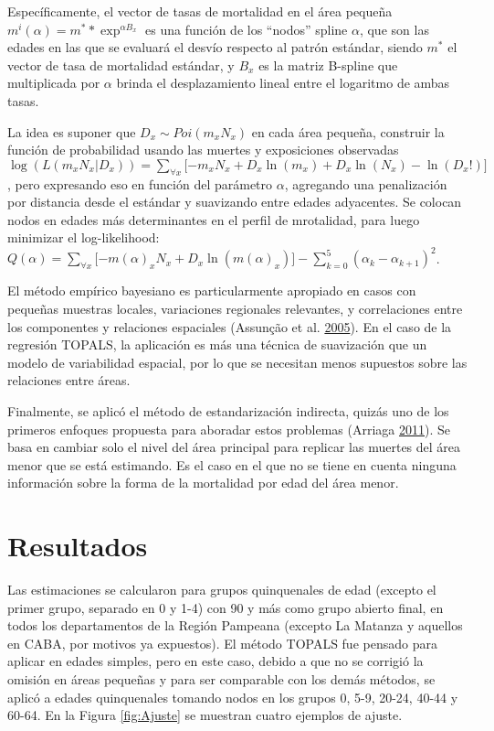 \documentclass[12pt,]{article}
\begin{document}
Específicamente, el vector de tasas de mortalidad en el área pequeña
\(m^{i}(\alpha) = m^{*}*\exp^{\alpha B_{x}}\) es una función de los
``nodos'' spline \(\alpha\), que son las edades en las que se evaluará
el desvío respecto al patrón estándar, siendo \(m^*\) el vector de tasa
de mortalidad estándar, y \(B_{x}\) es la matriz B-spline que
multiplicada por \(\alpha\) brinda el desplazamiento lineal entre el
logaritmo de ambas tasas.

La idea es suponer que \(D_{x}\sim Poi (m_ {x} N_ {x})\) en cada área
pequeña, construir la función de probabilidad usando las muertes y
exposiciones observadas
\(\log(L(m_{x}N_{x}|D_{x}))=\sum_{\forall x}{\lbrack -m_{x}N_{x}+D_{x}\ln (m_{x})+D_{x}\ln (N_{x})-\ln (D_{x}!)\rbrack}\),
pero expresando eso en función del parámetro \(\alpha\), agregando una
penalización por distancia desde el estándar y suavizando entre edades
adyacentes. Se colocan nodos en edades más determinantes en el perfil de
mrotalidad, para luego minimizar el log-likelihood:
\(Q(\alpha )=\sum_{\forall x}{\lbrack -m(\alpha )_{x}N_{x}+D_{x}\ln(m(\alpha )_{x})\rbrack }-\sum_{k=0}^{5}{(\alpha _{k}-\alpha _{k+1})^{2}}\).

El método empírico bayesiano es particularmente apropiado en casos con
pequeñas muestras locales, variaciones regionales relevantes, y
correlaciones entre los componentes y relaciones espaciales (Assunção et
al. \protect\hyperlink{ref-Assuncao2005}{2005}). En el caso de la
regresión TOPALS, la aplicación es más una técnica de suavización que un
modelo de variabilidad espacial, por lo que se necesitan menos supuestos
sobre las relaciones entre áreas.

Finalmente, se aplicó el método de estandarización indirecta, quizás uno
de los primeros enfoques propuesta para aboradar estos problemas
(Arriaga \protect\hyperlink{ref-Arriaga2011}{2011}). Se basa en cambiar
solo el nivel del área principal para replicar las muertes del área
menor que se está estimando. Es el caso en el que no se tiene en cuenta
ninguna información sobre la forma de la mortalidad por edad del área
menor.

\hypertarget{resultados}{%
\section{Resultados}\label{resultados}}

Las estimaciones se calcularon para grupos quinquenales de edad (excepto
el primer grupo, separado en 0 y 1-4) con 90 y más como grupo abierto
final, en todos los departamentos de la Región Pampeana (excepto La
Matanza y aquellos en CABA, por motivos ya expuestos). El método TOPALS
fue pensado para aplicar en edades simples, pero en este caso, debido a
que no se corrigió la omisión en áreas pequeñas y para ser comparable
con los demás métodos, se aplicó a edades quinquenales tomando nodos en
los grupos 0, 5-9, 20-24, 40-44 y 60-64. En la Figura \ref{fig:Ajuste}
se muestran cuatro ejemplos de ajuste.
\end{document}
